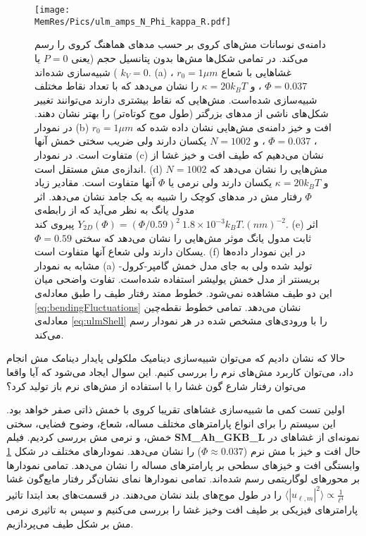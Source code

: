 \begin{figure}[htbp]
\begin{center}
\texttt{[image: \\MemRes/Pics/ulm\_amps\_N\_Phi\_kappa\_R.pdf]}
\caption{
دامنه‌ی نوسانات مش‌های کروی بر حسب مد‌های هماهنگ کروی را رسم می‌کند. در تمامی شکل‌ها مش‌ها بدون پتانسیل‌ حجم (یعنی
$P=0$
یا
$k_V=0$
) شبیه‌سازی شده‌اند. 
(a)
غشا‌هایی با شعاع
 $r_0=1\mu m$
،
 $\Phi=0.037$
، و
$\kappa=20k_BT$
را نشان می‌دهد که با تعداد نقاط مختلف شبیه‌سازی شده‌است.  مش‌هایی که نقاط بیشتری‌ دارند می‌توانند تغییر شکل‌های ناشی از مد‌های بزرگتر (طول موج کوتاه‌تر) را بهتر نشان دهند. در نمودار
(b)
افت و خیز دامنه‌‌ی مش‌هایی نشان داده شده که 
$r_0=1\mu m$
،
$\Phi=0.037$
، و
$N=1002$
یکسان دارند ولی ضریب سختی خمش آنها متفاوت است. در نمودار
(c)
نشان می‌دهیم که طیف افت و خیز غشا از اندازه‌ی مش مستقل است. 
(d)
مش‌هایی را نشان می‌دهد که 
$N=1002$
و
$\kappa=20k_BT$
یکسان دارند ولی نرمی یا 
$\Phi$
آنها متفاوت است. مقادیر زیاد 
 $\Phi$ 
رفتار مش‌ در مدهای کوچک را شبیه به یک جامد نشان می‌دهد. اثر مدول یانگ به نظر می‌آید که از رابطه‌ی
$Y_{2D}(\Phi)=(\Phi/0.59)^2~1.8\times10^{-3}k_BT.(nm)^{-2}$
پیروی کند. 
(e)
اثر ثابت مدول یانگ موثر مش‌هایی را نشان می‌دهد که سختی
$\Phi=0.59$
یسکان دارند ولی شعاع آنها متفاوت است. 
(f)
در این نمودار داده‌ها مشابه به نمودار 
(a)
تولید شده ولی به جای مدل خمش گامپر-کرول-بریسنتر از مدل خمش یولیشر استفاده شده‌است. تفاوت واضحی میان این دو طیف مشاهده نمی‌شود. خطوط ممتد رفتار طیف را طبق معادله‌ی
\ref{eq:bendingFluctuations}
نشان می‌دهد. تمامی خطوط نقطه‌چین معادله‌ی 
\ref{eq:ulmShell}
را با ورودی‌های مشخص شده در هر نمودار رسم می‌کند.
}
\label{fig:kappaULMS}
\end{center}
\end{figure}

حالا که نشان دادیم که می‌توان شبیه‌سازی دینامیک ملکولی پایدار دینامک مش انجام داد، می‌توان کاربرد مش‌های نرم را بررسی کنیم. این سوال ایجاد می‌شود که آیا واقعا می‌توان رفتار شارع گون غشا را با استفاده از مش‌های نرم باز تولید کرد؟

اولین تست کمی‌ ما شبیه‌سازی غشا‌های تقریبا کروی با خمش ذاتی صفر خواهد بود. این سیستم را برای انواع پارامترهای مختلف مساله، شعاع، وضوح فضایی، سختی خمش، و نرمی مش بررسی کردیم. فیلم
{\bf SM\_Ah\_GKB\_L}
نمونه‌ای از غشاهای در حال افت و خیز با مش‌ نرم 
($\Phi\approx0.037$)
را نشان می‌دهد. نمودارهای مختلف در شکل
\ref{fig:kappaULMS}
وابستگی افت و خیز‌های سطحی بر پارامتر‌های مساله را نشان می‌دهد. تمامی نمودار‌ها بر محور‌های لوگاریتمی رسم شده‌اند. تمامی نمودار‌ها نمای نشان‌گر رفتار مایع‌گون غشا
$\langle|u_{\ell,m}|^2\rangle\propto \frac{1}{\ell^4}$
را در طول‌ موج‌های بلند نشان می‌دهند. در قسمت‌های بعد ابتدا تاثیر پارامتر‌های فیزیکی بر طیف افت وخیز غشا را بررسی می‌کنیم و سپس به تاثیری نرمی مش بر شکل طیف می‌پردازیم.

